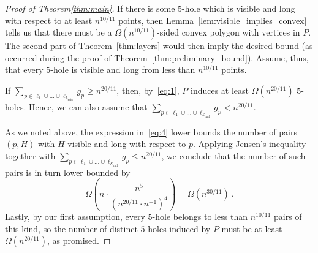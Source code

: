 \documentclass[12pt,reqno, a4paper]{amsart}
\begin{document}
\begin{proof}[Proof of Theorem\ref{thm:main}]
    If there is some $5$-hole which is visible and long with respect to at least $n^{10/11}$ points, then Lemma~\ref{lem:visible_implies_convex} tells us that there must be a $\Omega(n^{10/11})$-sided convex polygon with vertices in $P$. The second part of Theorem~\ref{thm:layers} would then imply the desired bound (as occurred during the proof of Theorem~\ref{thm:preliminary_bound}). Assume, thus, that every $5$-hole is visible and long from less than $n^{10/11}$ points.

    If $\sum_{p\in \ell_1\cup\dots\cup\ell_{k_{\operatorname{mid}}}} g_p\geq n^{20/11}$, then, by~\eqref{eq:1}, $P$ induces at least $\Omega(n^{20/11})$ $5$-holes. Hence, we can also assume that $\sum_{p\in \ell_1\cup\dots\cup\ell_{k_{\operatorname{mid}}}} g_p< n^{20/11}$. 

    As we noted above, the expression in~\eqref{eq:4} lower bounds the number of pairs $(p,H)$ with $H$ visible and long with respect to $p$. Applying Jensen's inequality together with $\sum_{p\in \ell_1\cup\dots\cup\ell_{k_{\operatorname{mid}}}} g_p\leq n^{20/11}$, we conclude that the number of such pairs is in turn lower bounded by \[\Omega\left(n\cdot\frac{n^5}{(n^{20/11}\cdot n^{-1})^{4}}\right)=\Omega(n^{30/11})\,.\] Lastly, by our first assumption, every $5$-hole belongs to less than $n^{10/11}$ pairs of this kind, so the number of distinct $5$-holes induced by $P$ must be at least $\Omega(n^{20/11})$, as promised.
\end{proof}



\end{document}

